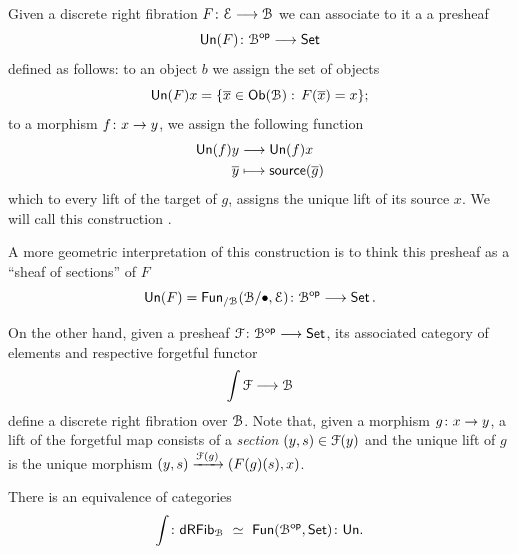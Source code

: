 \documentclass{amsbook}
\begin{document}
\begin{construction}\label{ap:: cons: discrete fibration}
    Given a discrete right fibration $F \colon \mathcal E \longrightarrow \mathcal B$ we can associate to it a a presheaf 
    \begin{equation}
        \mathsf{Un}(F) \colon \mathcal B^{\mathsf{op}} \longrightarrow \operatorname{{\mathsf{Set}}}
    \end{equation} 
    defined as follows: to an object $b$ we assign the set of objects 
    \begin{equation}
       \mathsf{Un}(F)x =  \{\overline{x}\in \mathsf{Ob}(\mathcal B):\, F(\overline{x})= x\};
    \end{equation}
    to a morphism $f\colon x \rightarrow y$, we assign the following function 
    \begin{align}
        \mathsf{Un}(f)y &\longrightarrow \mathsf{Un}(f)x \\
                    \overline{y} &\longmapsto \mathsf{source}(\overline{g})
    \end{align}
    which to every lift of the target of $g$, assigns the unique lift of its source $x$. We will call this construction .

    \medskip 

    \nid A more geometric interpretation of this construction is to think this presheaf as a ``sheaf of sections'' of $F$
    \begin{equation}
        \mathsf{Un}(F) = \operatorname{{\sf Fun}}_{/\mathcal B}(\mathcal B/\bullet, \mathcal E) \colon \mathcal B^{\mathsf{op}} \longrightarrow \operatorname{{\mathsf{Set}}}.
    \end{equation} 
    
    \medskip
    On the other hand, given a presheaf $\mathcal F \colon \mathcal B^{\mathsf{op}} \longrightarrow \operatorname{{\mathsf{Set}}}$, its associated category of elements  and respective forgetful functor
    \begin{equation}
        \int \mathcal F \longrightarrow \mathcal B
    \end{equation}
    define a discrete right fibration over $\mathcal B$. Note that, given a morphism $g\colon x \rightarrow y$, a lift of the forgetful map consists of a \emph{section} $(y, s) \in \mathcal F(y)$ and the unique lift of $g$ is the unique morphism $(y,s) \xrightarrow{\mathcal F(g)} (F(g)(s), x)$.
\end{construction}

\begin{proposition}
    There is an equivalence of categories 
    \begin{equation}
        \int \colon \mathsf{dRFib}_{\mathcal B} \,\, \simeq \,\, \operatorname{{\sf Fun}}(\mathcal B^{\mathsf{op}}, \operatorname{{\mathsf{Set}}}) \colon \mathsf{Un}.
    \end{equation}
\end{proposition}
\end{document}
